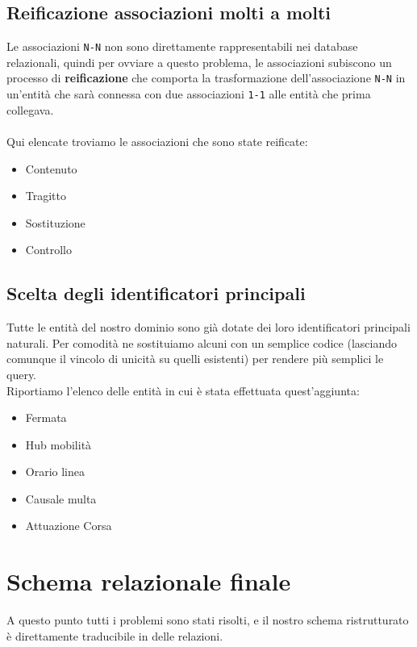 \documentclass[12pt,a4paper]{report}
\begin{document}
\subsection{Reificazione associazioni molti a molti}
Le associazioni \texttt{N-N} non sono direttamente rappresentabili nei database relazionali, quindi per ovviare a questo problema, le associazioni subiscono un processo di \textbf{reificazione} che comporta la trasformazione dell'associazione \texttt{N-N} in un'entità che sarà connessa con due associazioni \texttt{1-1} alle entità che prima collegava.\\ \\
Qui elencate troviamo le associazioni che sono state reificate:
\begin{itemize}
    \item Contenuto
    \item Tragitto
    \item Sostituzione
    \item Controllo
\end{itemize}

\subsection{Scelta degli identificatori principali}
Tutte le entità del nostro dominio sono già dotate dei loro identificatori principali naturali.
Per comodità ne sostituiamo alcuni con un semplice codice (lasciando comunque il vincolo di unicità su quelli esistenti) per rendere più semplici le query.\\
Riportiamo l'elenco delle entità in cui è stata effettuata quest'aggiunta:
\begin{itemize}
    \item Fermata
    \item Hub mobilità
    \item Orario linea
    \item Causale multa
    \item Attuazione Corsa
\end{itemize}

\section{Schema relazionale finale}\label{section:schema_relazionale}
A questo punto tutti i problemi sono stati risolti, e il nostro schema ristrutturato è direttamente traducibile in delle relazioni.


\end{document}
